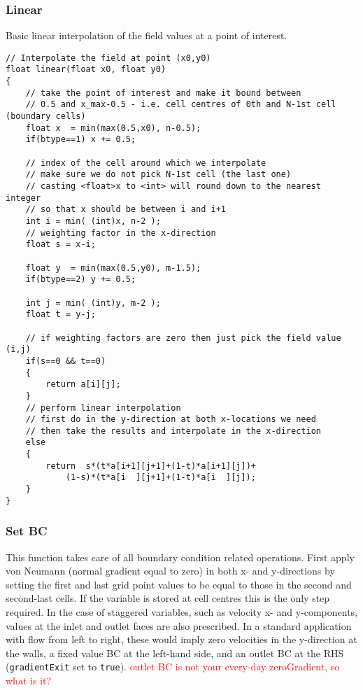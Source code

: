 \documentclass[notitlepage]{article}
\begin{document}
\subsubsection{Linear}

Basic linear interpolation of the field values at a point of interest.

\begin{lstlisting}[style=myCpp]
// Interpolate the field at point (x0,y0)
float linear(float x0, float y0)
{
	// take the point of interest and make it bound between
	// 0.5 and x_max-0.5 - i.e. cell centres of 0th and N-1st cell (boundary cells)
	float x  = min(max(0.5,x0), n-0.5);
	if(btype==1) x += 0.5;
	
	// index of the cell around which we interpolate
	// make sure we do not pick N-1st cell (the last one)
	// casting <float>x to <int> will round down to the nearest integer
	// so that x should be between i and i+1
	int i = min( (int)x, n-2 ); 
	// weighting factor in the x-direction
	float s = x-i;
	
	float y  = min(max(0.5,y0), m-1.5);
	if(btype==2) y += 0.5;
	
	int j = min( (int)y, m-2 );
	float t = y-j;
	
	// if weighting factors are zero then just pick the field value (i,j)
	if(s==0 && t==0)
	{
		return a[i][j];
	}
	// perform linear interpolation
	// first do in the y-direction at both x-locations we need
	// then take the results and interpolate in the x-direction
	else
	{
		return  s*(t*a[i+1][j+1]+(1-t)*a[i+1][j])+
			(1-s)*(t*a[i  ][j+1]+(1-t)*a[i  ][j]);
	}
}
\end{lstlisting}

\subsubsection{Set BC}

This function takes care of all boundary condition related operations.
First apply von Neumann (normal gradient equal to zero) in both
x- and y-directions by setting the first and last grid point values to be equal to
those in the second and second-last cells. If the variable is stored at cell centres this is the only
step required. In the case of staggered variables, such as velocity x- and y-components, values
at the inlet and outlet faces are also prescribed. In a standard application with flow from left to right,
these would imply zero velocities in the y-direction at the walls, a fixed value BC at the left-hand side,
and an outlet BC at the RHS (\texttt{gradientExit} set to \texttt{true}).
\textcolor{red}{outlet BC is not your every-day zeroGradient, so what is it?}
\end{document}
